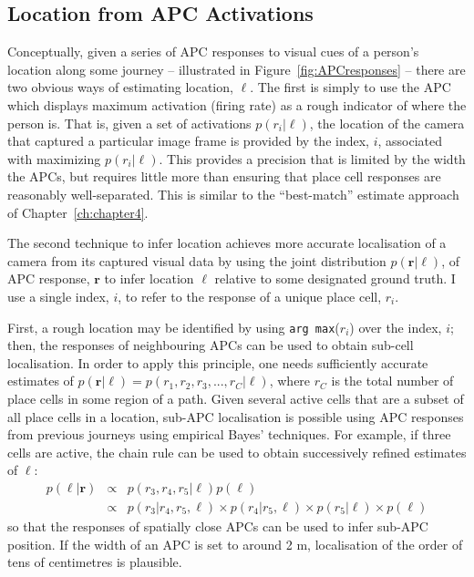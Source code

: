 \subsection{Location from APC Activations}
Conceptually, given a series of APC responses to visual cues of a person's location along some journey -- illustrated in Figure~\ref{fig:APCresponses} -- there are two obvious ways of estimating location, $\ell$.  The first is simply to use the APC which displays maximum activation (firing rate) as a rough indicator of where the person is. That is, given a set of activations $p(r_i|\ell)$, the location of the camera that captured a particular image frame is provided by the index, $i$, associated with maximizing $p(r_i|\ell)$. This provides a precision that is limited by the width the APCs, but requires little more than ensuring that place cell responses are reasonably well-separated. This is similar to the ``best-match'' estimate approach of Chapter~\ref{ch:chapter4}.

The second technique to infer location achieves more accurate localisation of a camera from its captured visual data by using the joint distribution $p(\mathbf{r}|\ell)$, of APC response, $\mathbf{r}$ to infer location $\ell$ relative to some designated ground truth.  I use a single index, $i$, to refer to the response of a unique place cell, $r_i$.

 First, a rough location may be identified by using \texttt{arg max}($r_i$) over the index, $i$; then, the responses of neighbouring APCs can be used to obtain sub-cell localisation.  In order to apply this principle, one needs sufficiently accurate estimates of $p(\mathbf{r}|\ell) = p(r_1,r_2,r_3,...,r_C|\ell)$, where $r_C$ is the total number of place cells in some region of a path.   Given several active cells that are a subset of all place cells in a location, sub-APC localisation is possible using APC responses from previous journeys using empirical Bayes' techniques. For example, if three cells are active, the chain rule can be used to obtain successively refined estimates of $\ell$:
\begin{eqnarray}
p(\ell|\mathbf{r}) & \propto & p(r_3,r_4,r_5|\ell)p(\ell) \nonumber \\
&\propto& p(r_3|r_4,r_5,\ell)\times p(r_4|r_5,\ell)\times p(r_5|\ell)\times p(\ell)
\end{eqnarray}
 so that the responses of spatially close APCs can be used to infer sub-APC position.  If the width of an APC is set to around 2 m, localisation of the order of tens of centimetres is plausible. 


